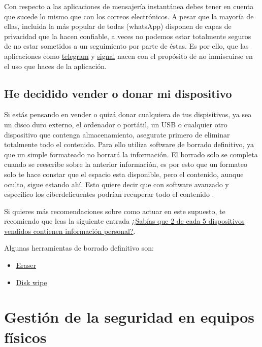 \documentclass[
  spanish,
  a4paper,
  openany]{book}
\begin{document}
Con respecto a las aplicaciones de mensajería instantánea debes tener en cuenta que sucede lo mismo que con los correos electrónicos. A pesar que la mayoría de ellas, incluida la más popular de todas (whatsApp) disponen de capas de privacidad que la hacen confiable, a veces no podemos estar totalmente seguros de no estar sometidos a un seguimiento por parte de éstas. Es por ello, que las aplicaciones como \href{https://telegram.org/}{telegram} y \href{https://signal.org/es/}{signal} nacen con el propósito de no inmiscuirse en el uso que haces de la aplicación.

\hypertarget{he-decidido-vender-o-donar-mi-dispositivo}{%
\section{He decidido vender o donar mi dispositivo}\label{he-decidido-vender-o-donar-mi-dispositivo}}

Si estás pensando en vender o quizá donar cualquiera de tus dispisitivos, ya sea un disco duro externo, el ordenador o portátil, un USB o cualquier otro dispositivo que contenga almacenamiento, asegurate primero de eliminar totalmente todo el contenido. Para ello utiliza software de borrado definitivo, ya que un simple formateado no borrará la información. El borrado solo se completa cuando se reescribe sobre la anterior información, es por esto que un formateo solo te hace constar que el espacio esta disponible, pero el contenido, aunque oculto, sigue estando ahí. Esto quiere decir que con software avanzado y específico los ciberdelicuentes podrían recuperar todo el contenido \citep{XATAKA-borrado-almacenamiento}.

Si quieres más recomendaciones sobre como actuar en este supuesto, te recomiendo que leas la siguiente entrada \href{https://www.osi.es/es/actualidad/blog/2019/10/09/sabias-que-2-de-cada-5-dispositivos-vendidos-contienen-informacion}{¿Sabías que 2 de cada 5 dispositivos vendidos contienen información personal?}.

Algunas herramientas de borrado definitivo son:

\begin{itemize}
\item
  \href{https://eraser.heidi.ie/}{Eraser}
\item
  \href{https://www.diskwipe.org/download.php}{Disk wipe}
\end{itemize}

\hypertarget{gestiuxf3n-de-la-seguridad-en-equipos-fuxedsicos}{%
\chapter{Gestión de la seguridad en equipos físicos}\label{gestiuxf3n-de-la-seguridad-en-equipos-fuxedsicos}}
\end{document}
